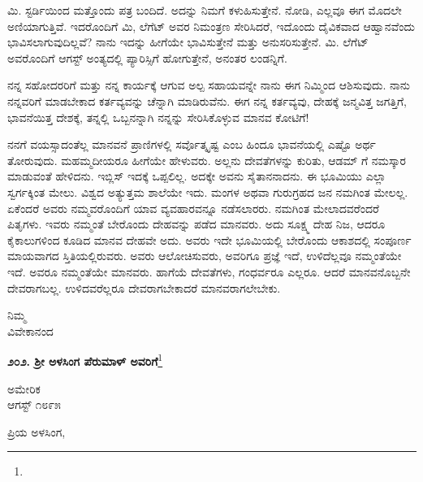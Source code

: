 ಮಿ. ಸ್ಟರ್ಡಿಯಿಂದ ಮತ್ತೊಂದು ಪತ್ರ ಬಂದಿದೆ. ಅದನ್ನು ನಿಮಗೆ ಕಳುಹಿಸುತ್ತೇನೆ. ನೋಡಿ, ಎಲ್ಲವೂ ಈಗ ಮೊದಲೇ ಅಣಿಯಾಗುತ್ತಿವೆ. ಇದರೊಂದಿಗೆ ಮಿ, ಲೆಗೆಟ್ ಅವರ ನಿಮಂತ್ರಣ ಸೇರಿಸಿದರೆ, ಇದೊಂದು ದೈವಿಕವಾದ ಆಹ್ವಾನವೆಂದು ಭಾವಿಸಲಾಗುವುದಿಲ್ಲವೆ? ನಾನು ಇದನ್ನು ಹೀಗೆಯೇ ಭಾವಿಸುತ್ತೇನೆ ಮತ್ತು ಅನುಸರಿಸುತ್ತೇನೆ. ಮಿ. ಲೆಗೆಟ್ ಅವರೊಂದಿಗೆ ಆಗಸ್ಟ್ ಅಂತ್ಯದಲ್ಲಿ ಪ್ಯಾರಿಸ್ಸಿಗೆ ಹೋಗುತ್ತೇನೆ, ಅನಂತರ ಲಂಡನ್ನಿಗೆ.

\vspace{0.15cm}

ನನ್ನ ಸಹೋದರರಿಗೆ ಮತ್ತು ನನ್ನ ಕಾರ್ಯಕ್ಕೆ ಆಗುವ ಅಲ್ಪ ಸಹಾಯವನ್ನೇ ನಾನು ಈಗ ನಿಮ್ಮಿಂದ ಆಶಿಸುವುದು. ನಾನು ನನ್ನವರಿಗೆ ಮಾಡಬೇಕಾದ ಕರ್ತವ್ಯವನ್ನು ಚೆನ್ನಾಗಿ ಮಾಡಿರುವೆನು. ಈಗ ನನ್ನ ಕರ್ತವ್ಯವು, ದೇಹಕ್ಕೆ ಜನ್ಮವಿತ್ತ ಜಗತ್ತಿಗೆ, ಭಾವನೆಯಿತ್ತ ದೇಶಕ್ಕೆ, ತನ್ನಲ್ಲಿ ಒಬ್ಬನನ್ನಾಗಿ ನನ್ನನ್ನು ಸೇರಿಸಿಕೊಳ್ಳುವ ಮಾನವ ಕೋಟಿಗೆ!

\vspace{0.15cm}

ನನಗೆ ವಯಸ್ಸಾದಂತೆಲ್ಲ ಮಾನವನೆ ಪ್ರಾಣಿಗಳಲ್ಲಿ ಸರ್ವೊತ್ಕೃಷ್ಟ ಎಂಬ ಹಿಂದೂ ಭಾವನೆಯಲ್ಲಿ ಎಷ್ಟೊ ಅರ್ಥ ತೋರುವುದು. ಮಹಮ್ಮದೀಯರೂ ಹೀಗೆಯೇ ಹೇಳುವರು. ಅಲ್ಲನು ದೇವತೆಗಳನ್ನು ಕುರಿತು, ಆಡಮ್ ಗೆ ನಮಸ್ಕಾರ ಮಾಡುವಂತೆ ಹೇಳಿದನು. ಇಬ್ಲಿಸ್ ಇದಕ್ಕೆ ಒಪ್ಪಲಿಲ್ಲ. ಅದಕ್ಕೇ ಅವನು ಸೈತಾನನಾದನು. ಈ ಭೂಮಿಯು ಎಲ್ಲಾ ಸ್ವರ್ಗಕ್ಕಿಂತ ಮೇಲು. ವಿಶ್ವದ ಅತ್ಯುತ್ತಮ ಶಾಲೆಯೇ ಇದು. ಮಂಗಳ ಅಥವಾ ಗುರುಗ್ರಹದ ಜನ ನಮಗಿಂತ ಮೇಲಲ್ಲ. ಏಕೆಂದರೆ ಅವರು ನಮ್ಮವರೊಂದಿಗೆ ಯಾವ ವ್ಯವಹಾರವನ್ನೂ ನಡೆಸಲಾರರು. ನಮಗಿಂತ ಮೇಲಾದವರೆಂದರೆ ಪಿತೃಗಳು. ಇವರು ನಮ್ಮಂತೆ ಬೇರೊಂದು ದೇಹವನ್ನು ಪಡೆದ ಮಾನವರು. ಅದು ಸೂಕ್ಷ್ಮ ದೇಹ ನಿಜ, ಆದರೂ ಕೈಕಾಲುಗಳಿಂದ ಕೂಡಿದ ಮಾನವ ದೇಹವೇ ಅದು. ಅವರು ಇದೇ ಭೂಮಿಯಲ್ಲಿ ಬೇರೊಂದು ಆಕಾಶದಲ್ಲಿ ಸಂಪೂರ್ಣ ಮಾಯವಾಗದ ಸ್ತಿತಿಯಲ್ಲಿರುವರು. ಅವರು ಆಲೋಚಿಸುವರು, ಅವರಿಗೂ ಪ್ರಜ್ಞೆ ಇದೆ, ಉಳಿದೆಲ್ಲವೂ ನಮ್ಮಂತೆಯೇ ಇದೆ. ಅವರೂ ನಮ್ಮಂತೆಯೇ ಮಾನವರು. ಹಾಗೆಯೆ ದೇವತೆಗಳು, ಗಂಧರ್ವರೂ ಎಲ್ಲರೂ. ಆದರೆ ಮಾನವನೊಬ್ಬನೇ ದೇವರಾಗಬಲ್ಲ. ಉಳಿದವರೆಲ್ಲರೂ ದೇವರಾಗಬೇಕಾದರೆ ಮಾನವರಾಗಲೇಬೇಕು.

{\flushright
ನಿಮ್ಮ\\ವಿವೇಕಾನಂದ\par}

\newpage

\begin{center}
\textbf{೨೦೨. ಶ‍್ರೀ ಅಳಸಿಂಗ ಪೆರುಮಾಳ್ ಅವರಿಗೆ}\footnote{}
\end{center}

\vspace{-0.5cm}

\begin{flushright}
ಅಮೇರಿಕ\\ಆಗಸ್ಟ್ ೧೮೯೫
\end{flushright}

\noindent
ಪ್ರಿಯ ಅಳಸಿಂಗ,

